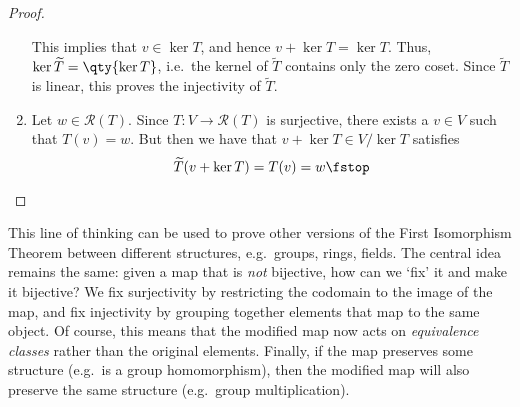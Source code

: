 \begin{proof}
\begin{enumerate}[label=(\roman*)]
     This implies that \( v\in\ker T \), and hence \( v+\ker T=\ker T \). Thus, \( \ker\widetilde{T}=\qty{\ker T} \), i.e.\ the kernel of \( \widetilde{T} \) contains only the zero coset. Since \( \widetilde{T} \) is linear, this proves the injectivity of \( \widetilde{T} \).
   \item Let \( w\in\mathcal{R}(T) \). Since \( T:V\to\mathcal{R}(T) \) is surjective, there exists a \( v\in V \) such that \( T(v)=w \). But then we have that \( v+\ker T\in V/\ker T \) satisfies
     \[ \widetilde{T}(v+\ker T)=T(v)=w\fstop \]
   \end{enumerate}
 \end{proof}

 This line of thinking can be used to prove other versions of the First Isomorphism Theorem between different structures, e.g.\ groups, rings, fields. The central idea remains the same: given a map that is \emph{not} bijective, how can we `fix' it and make it bijective? We fix surjectivity by restricting the codomain to the image of the map, and fix injectivity by grouping together elements that map to the same object. Of course, this means that the modified map now acts on \emph{equivalence classes} rather than the original elements. Finally, if the map preserves some structure (e.g.\ is a group homomorphism), then the modified map will also preserve the same structure (e.g.\ group multiplication).

 \vspace{3mm}

